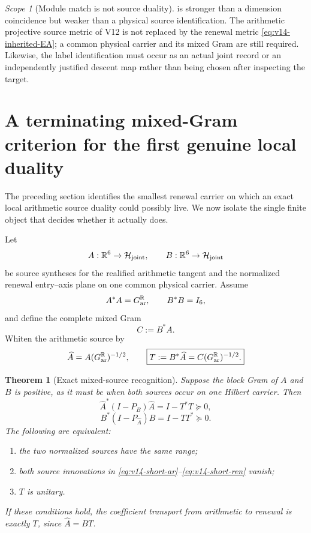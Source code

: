 \documentclass[11pt]{article}
\newtheorem{theorem}{Theorem}[section]
\theoremstyle{definition}
\theoremstyle{remark}
\newtheorem{scope}[scope]{Scope}
\newcommand{\R}{\mathbb R}
\begin{document}
\begin{scope}[Module match is not source duality]
 is stronger than a dimension coincidence but
weaker than a physical source identification.  The arithmetic projective
source metric of V12 is not replaced by the renewal metric
\eqref{eq:v14-inherited-EA}; a common physical carrier and its mixed Gram are
still required.  Likewise, the label identification must occur as an actual
joint record or an independently justified descent map rather than being
chosen after inspecting the target.
\end{scope}

\section{A terminating mixed-Gram criterion for the first genuine local duality}
\label{sec:v14-mixed-test}

The preceding section identifies the smallest renewal carrier on which an
exact local arithmetic source duality could possibly live.  We now isolate the
single finite object that decides whether it actually does.

Let
\[
 A:\R^6\to\mathcal H_{\rm joint},
 \qquad
 B:\R^6\to\mathcal H_{\rm joint}
\]
be source syntheses for the realified arithmetic tangent and the normalized
renewal entry--axis plane on one common physical carrier.  Assume
\[
 A^*A=G_{\rm ar}^{\R},
 \qquad B^*B=I_6,
\]
and define the complete mixed Gram
\begin{equation}
 \boxed{C:=B^*A.}
 \label{eq:v14-cross-gram}
\end{equation}
Whiten the arithmetic source by
\[
 \widehat A=A(G_{\rm ar}^{\R})^{-1/2},
 \qquad
 \boxed{T:=B^*\widehat A=C(G_{\rm ar}^{\R})^{-1/2}.}
 \label{eq:v14-normalized-cross}
\]

\begin{theorem}[Exact mixed-source recognition]
\label{thm:v14-mixed-recognition}
Suppose the block Gram of $A$ and $B$ is positive, as it must be when both
sources occur on one Hilbert carrier.  Then
\begin{equation}
 \boxed{
 \widehat A^*(I-P_B)\widehat A=I-T^*T\succeq0,}
 \label{eq:v14-short-ar}
\end{equation}
\begin{equation}
 \boxed{
 B^*(I-P_{\widehat A})B=I-TT^*\succeq0.}
 \label{eq:v14-short-ren}
\end{equation}
The following are equivalent:
\begin{enumerate}[label=\textup{(\roman*)},leftmargin=2.8em]
\item the two normalized sources have the same range;
\item both source innovations in
      \eqref{eq:v14-short-ar}--\eqref{eq:v14-short-ren} vanish;
\item $T$ is unitary.
\end{enumerate}
If these conditions hold, the coefficient transport from arithmetic to
renewal is exactly $T$, since $\widehat A=BT$.
\end{theorem}
\end{document}
